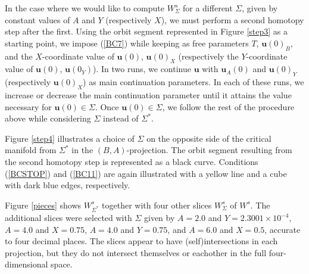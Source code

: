 \documentclass{ws-ijbc}
\begin{document}
In the case where we would like to compute $W^{s}_{\Sigma}$ for a different $\Sigma$, given by constant values of $A$ and $Y$ (respectively $X$), we must perform a second homotopy step after the first.  Using the orbit segment represented in Figure \ref{step3} as a starting point, we impose (\ref{BC7}) while keeping as free parameters $T$, $\mathbf{u}(0)_B$, and the $X$-coordinate value of $\mathbf{u}(0)$, $\mathbf{u}(0)_X$ (respectively the $Y$-coordinate value of $\mathbf{u}(0)$, $\mathbf{u}(0_Y)$).  In two runs, we continue $\mathbf{u}$ with $\mathbf{u}_A(0)$ and $\mathbf{u}(0)_Y$ (respectively $\mathbf{u}(0)_X$) as main continuation parameters.  In each of these runs, we increase or decrease the main continuation parameter until it attains the value necessary for $\mathbf{u}(0) \in \Sigma$.  Once $\mathbf{u}(0) \in \Sigma$, we follow the rest of the procedure above while considering $\Sigma$ instead of $\Sigma^*$.
    
Figure \ref{step4} illustrates a choice of $\Sigma$ on the opposite side of the critical manifold from $\Sigma^*$ in the $(B,A)$-projection.  The orbit segment resulting from the second homotopy step is represented as a black curve.  Conditions (\ref{BCSTOP}) and (\ref{BC11}) are again illustrated with a yellow line and a cube with dark blue edges, respectively.
    
Figure \ref{pieces} shows $W^s_{\Sigma^*}$ together with four other slices $W^{s}_{\Sigma}$ of $W^{s}$.  The additional slices were selected with $\Sigma$ given by $A=2.0$ and $Y=2.3001 \times 10^{-4}$, $A=4.0$ and $X=0.75$, $A=4.0$ and $Y=0.75$, and $A=6.0$ and $X=0.5$, accurate to four decimal places.  The slices appear to have (self)intersections in each projection, but they do not intersect themselves or eachother in the full four-dimensional space.  
\end{document}
